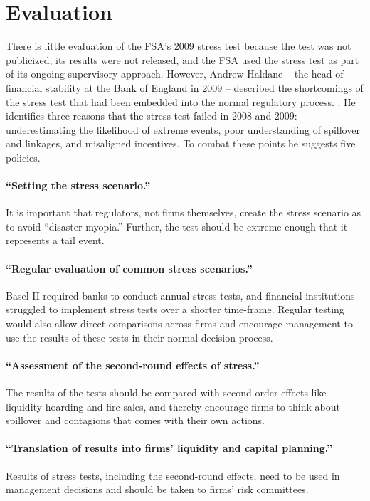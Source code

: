 \section{Evaluation}

There is little evaluation of the FSA's 2009 stress test because the test was not publicized, its results were not released, and the FSA used the stress test as part of its ongoing supervisory approach. However, Andrew Haldane -- the head of financial stability at the Bank of England in 2009 -- described the shortcomings of the stress test that had been embedded into the normal regulatory process. \citep{Haldane}. He identifies three reasons that the stress test failed in 2008 and 2009: underestimating the likelihood of extreme events, poor understanding of spillover and linkages, and misaligned incentives. To combat these points he suggests five policies.

\paragraph{``Setting the stress scenario.''} It is important that regulators, not firms themselves, create the stress scenario as to avoid ``disaster myopia.'' Further, the test should be extreme enough that it represents a tail event.

\paragraph{``Regular evaluation of common stress scenarios.''} Basel II required banks to conduct annual stress tests, and financial institutions struggled to implement stress tests over a shorter time-frame. Regular testing would also allow direct comparisons across firms and encourage management to use the results of these tests in their normal decision process.

\paragraph{``Assessment of the second-round effects of stress.''} The results of the tests should be compared with second order effects like liquidity hoarding and fire-sales, and thereby encourage firms to think about spillover and contagions that comes with their own actions.

\paragraph{``Translation of results into firms' liquidity and capital planning.''} Results of stress tests, including the second-round effects, need to be used in management decisions and should be taken to firms' risk committees.

